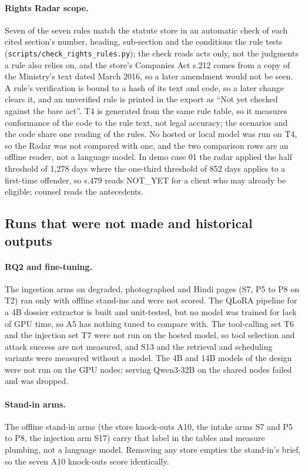 \paragraph{Rights Radar scope.} Seven of the seven rules match the statute store in an automatic check of each cited section's number, heading, sub-section and the conditions the rule tests (\texttt{scripts/check\_rights\_rules.py}); the check reads acts only, not the judgments a rule also relies on, and the store's Companies Act s.212 comes from a copy of the Ministry's text dated March 2016, so a later amendment would not be seen. A rule's verification is bound to a hash of its text and code, so a later change clears it, and an unverified rule is printed in the export as ``Not yet checked against the bare act''. T4 is generated from the same rule table, so it measures conformance of the code to the rule text, not legal accuracy; the scenarios and the code share one reading of the rules. No hosted or local model was run on T4, so the Radar was not compared with one, and the two comparison rows are an offline reader, not a language model. In demo case 01 the radar applied the half threshold of 1,278 days where the one-third threshold of 852 days applies to a first-time offender, so s.479 reads NOT\_YET for a client who may already be eligible; counsel reads the antecedents.

\subsection{Runs that were not made and historical outputs}

\paragraph{RQ2 and fine-tuning.} The ingestion arms on degraded, photographed and Hindi pages (S7, P5 to P8 on T2) ran only with offline stand-ins and were not scored. The QLoRA pipeline for a 4B dossier extractor is built and unit-tested, but no model was trained for lack of GPU time, so A5 has nothing tuned to compare with. The tool-calling set T6 and the injection set T7 were not run on the hosted model, so tool selection and attack success are not measured, and S13 and the retrieval and scheduling variants were measured without a model. The 4B and 14B models of the design were not run on the GPU nodes; serving Qwen3-32B on the shared nodes failed and was dropped.

\paragraph{Stand-in arms.} The offline stand-in arms (the store knock-outs A10, the intake arms S7 and P5 to P8, the injection arm S17) carry that label in the tables and measure plumbing, not a language model. Removing any store empties the stand-in's brief, so the seven A10 knock-outs score identically.

